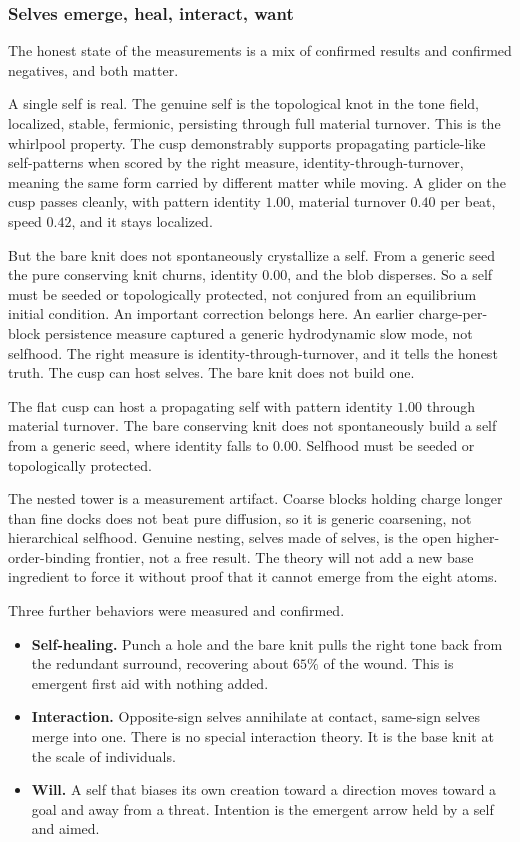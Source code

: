 \subsubsection{Selves emerge, heal, interact, want}

The honest state of the measurements is a mix of confirmed results and confirmed negatives, and both matter.

A single self is real. The genuine self is the topological knot in the tone field, localized, stable, fermionic, persisting through full material turnover. This is the whirlpool property. The cusp demonstrably supports propagating particle-like self-patterns when scored by the right measure, identity-through-turnover, meaning the same form carried by different matter while moving. A glider on the cusp passes cleanly, with pattern identity $1.00$, material turnover $0.40$ per beat, speed $0.42$, and it stays localized.

But the bare knit does not spontaneously crystallize a self. From a generic seed the pure conserving knit churns, identity $0.00$, and the blob disperses. So a self must be seeded or topologically protected, not conjured from an equilibrium initial condition. An important correction belongs here. An earlier charge-per-block persistence measure captured a generic hydrodynamic slow mode, not selfhood. The right measure is identity-through-turnover, and it tells the honest truth. The cusp can host selves. The bare knit does not build one.

\begin{result}
The flat cusp can host a propagating self with pattern identity $1.00$ through material turnover. The bare conserving knit does not spontaneously build a self from a generic seed, where identity falls to $0.00$. Selfhood must be seeded or topologically protected.
\end{result}

The nested tower is a measurement artifact. Coarse blocks holding charge longer than fine docks does not beat pure diffusion, so it is generic coarsening, not hierarchical selfhood. Genuine nesting, selves made of selves, is the open higher-order-binding frontier, not a free result. The theory will not add a new base ingredient to force it without proof that it cannot emerge from the eight atoms.

Three further behaviors were measured and confirmed.

\begin{itemize}
\item \textbf{Self-healing.} Punch a hole and the bare knit pulls the right tone back from the redundant surround, recovering about $65\%$ of the wound. This is emergent first aid with nothing added.
\item \textbf{Interaction.} Opposite-sign selves annihilate at contact, same-sign selves merge into one. There is no special interaction theory. It is the base knit at the scale of individuals.
\item \textbf{Will.} A self that biases its own creation toward a direction moves toward a goal and away from a threat. Intention is the emergent arrow held by a self and aimed.
\end{itemize}

